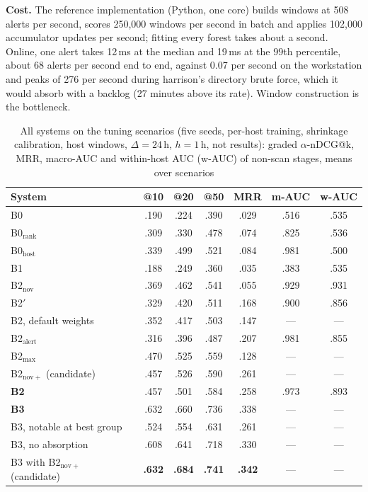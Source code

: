 \documentclass[conference]{IEEEtran}
\begin{document}
\textbf{Cost.} The reference implementation (Python, one core) builds windows at 508 alerts per second, scores 250{,}000 windows per second in batch and applies 102{,}000 accumulator updates per second; fitting every forest takes about a second. Online, one alert takes 12\,ms at the median and 19\,ms at the 99th percentile, about 68 alerts per second end to end, against 0.07 per second on the workstation and peaks of 276 per second during harrison's directory brute force, which it would absorb with a backlog (27 minutes above its rate). Window construction is the bottleneck.

\begin{table}[t]
\caption{All systems on the tuning scenarios (five seeds, per-host training, shrinkage calibration, host windows, $\Delta = 24$\,h, $h = 1$\,h, not results): graded $\alpha$-nDCG@k, MRR, macro-AUC and within-host AUC (w-AUC) of non-scan stages, means over scenarios}
\label{tab:tuneall}
\centering\footnotesize
\setlength{\tabcolsep}{3pt}
\begin{tabular}{@{}l cccccc@{}}
\toprule
\textbf{System} & \textbf{@10} & \textbf{@20} & \textbf{@50} & \textbf{MRR} & \textbf{m-AUC} & \textbf{w-AUC} \\
\midrule
B0 & .190 & .224 & .390 & .029 & .516 & .535 \\
B0$_\mathrm{rank}$ & .309 & .330 & .478 & .074 & .825 & .536 \\
B0$_\mathrm{host}$ & .339 & .499 & .521 & .084 & .981 & .500 \\
B1 & .188 & .249 & .360 & .035 & .383 & .535 \\
B2$_\mathrm{nov}$ & .369 & .462 & .541 & .055 & .929 & .931 \\
B2$'$ & .329 & .420 & .511 & .168 & .900 & .856 \\
B2, default weights & .352 & .417 & .503 & .147 & --- & --- \\
B2$_\mathrm{alert}$ & .316 & .396 & .487 & .207 & .981 & .855 \\
B2$_\mathrm{max}$ & .470 & .525 & .559 & .128 & --- & --- \\
B2$_\mathrm{nov+}$ (candidate) & .457 & .526 & .590 & .261 & --- & --- \\
\textbf{B2} & .457 & .501 & .584 & .258 & .973 & .893 \\
\textbf{B3} & .632 & .660 & .736 & .338 & --- & --- \\
B3, notable at best group & .524 & .554 & .631 & .261 & --- & --- \\
B3, no absorption & .608 & .641 & .718 & .330 & --- & --- \\
B3 with B2$_\mathrm{nov+}$ (candidate) & \textbf{.632} & \textbf{.684} & \textbf{.741} & \textbf{.342} & --- & --- \\
\bottomrule
\end{tabular}
\end{table}
\end{document}
